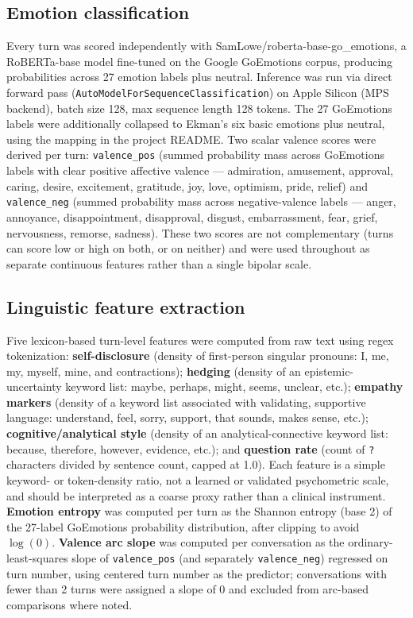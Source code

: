 \documentclass[11pt]{article}
\begin{document}
\subsection{Emotion classification}

Every turn was scored independently with SamLowe/roberta-base-go\_emotions, a RoBERTa-base model fine-tuned on the Google GoEmotions corpus, producing probabilities across 27 emotion labels plus neutral. Inference was run via direct forward pass (\texttt{AutoModelForSequenceClassification}) on Apple Silicon (MPS backend), batch size 128, max sequence length 128 tokens. The 27 GoEmotions labels were additionally collapsed to Ekman's six basic emotions plus neutral, using the mapping in the project README. Two scalar valence scores were derived per turn: \texttt{valence\_pos} (summed probability mass across GoEmotions labels with clear positive affective valence --- admiration, amusement, approval, caring, desire, excitement, gratitude, joy, love, optimism, pride, relief) and \texttt{valence\_neg} (summed probability mass across negative-valence labels --- anger, annoyance, disappointment, disapproval, disgust, embarrassment, fear, grief, nervousness, remorse, sadness). These two scores are not complementary (turns can score low or high on both, or on neither) and were used throughout as separate continuous features rather than a single bipolar scale.

\subsection{Linguistic feature extraction}

Five lexicon-based turn-level features were computed from raw text using regex tokenization: \textbf{self-disclosure} (density of first-person singular pronouns: I, me, my, myself, mine, and contractions); \textbf{hedging} (density of an epistemic-uncertainty keyword list: maybe, perhaps, might, seems, unclear, etc.); \textbf{empathy markers} (density of a keyword list associated with validating, supportive language: understand, feel, sorry, support, that sounds, makes sense, etc.); \textbf{cognitive/analytical style} (density of an analytical-connective keyword list: because, therefore, however, evidence, etc.); and \textbf{question rate} (count of \texttt{?} characters divided by sentence count, capped at 1.0). Each feature is a simple keyword- or token-density ratio, not a learned or validated psychometric scale, and should be interpreted as a coarse proxy rather than a clinical instrument. \textbf{Emotion entropy} was computed per turn as the Shannon entropy (base 2) of the 27-label GoEmotions probability distribution, after clipping to avoid $\log(0)$. \textbf{Valence arc slope} was computed per conversation as the ordinary-least-squares slope of \texttt{valence\_pos} (and separately \texttt{valence\_neg}) regressed on turn number, using centered turn number as the predictor; conversations with fewer than 2 turns were assigned a slope of 0 and excluded from arc-based comparisons where noted.
\end{document}
